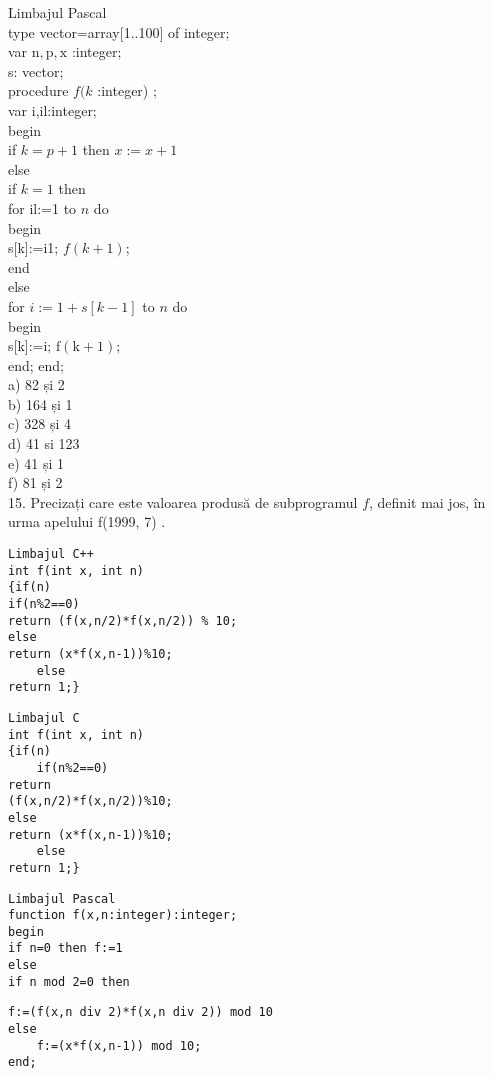 Limbajul Pascal\\[0pt]
type vector=array[1..100] of integer;\\
var $\mathrm{n}, \mathrm{p}, \mathrm{x}$ :integer;\\
s: vector;\\
procedure $f(k$ :integer) ;\\
var i,il:integer;\\
begin\\
if $k=p+1$ then $x:=x+1$\\
else\\
if $k=1$ then\\
for il:=1 to $n$ do\\
begin\\[0pt]
s[k]:=i1; $f(k+1)$;\\
end\\
else\\
for $i:=1+s[k-1]$ to $n$ do\\
begin\\[0pt]
s[k]:=i; $\mathrm{f}(\mathrm{k}+1)$;\\
end; end;\\
a) 82 și 2\\
b) 164 și 1\\
c) 328 și 4\\
d) 41 si 123\\
e) 41 și 1\\
f) 81 și 2\\
15. Precizați care este valoarea produsă de subprogramul $f$, definit mai jos, în urma apelului f(1999, 7) .

\begin{verbatim}
Limbajul C++
int f(int x, int n)
{if(n)
if(n%2==0)
return (f(x,n/2)*f(x,n/2)) % 10;
else
return (x*f(x,n-1))%10;
    else
return 1;}
\end{verbatim}

\begin{verbatim}
Limbajul C
int f(int x, int n)
{if(n)
    if(n%2==0)
return
(f(x,n/2)*f(x,n/2))%10;
else
return (x*f(x,n-1))%10;
    else
return 1;}
\end{verbatim}

\begin{verbatim}
Limbajul Pascal
function f(x,n:integer):integer;
begin
if n=0 then f:=1
else
if n mod 2=0 then
\end{verbatim}

\begin{verbatim}
f:=(f(x,n div 2)*f(x,n div 2)) mod 10
else
    f:=(x*f(x,n-1)) mod 10;
end;
\end{verbatim}

